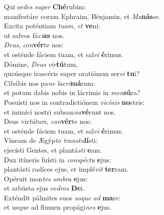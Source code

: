 \evenverse Qui se\textit{des} \textit{su}\textit{per} \textbf{Ché}rubim:~\*\\
\evenverse manifestáre coram Ephraim, Bénjamin, et \textit{Ma}\textbf{nás}se.\\
\oddverse Excita poténtiam \textit{tu}\textit{am}, \textit{et} \textbf{ve}ni:~\*\\
\oddverse ut salvos fá\textit{ci}\textbf{as} nos.\\
\evenverse \textit{De}\textit{us}, \textit{con}\textbf{vér}te nos:~\*\\
\evenverse et osténde fáciem tuam, et sal\textit{vi} \textbf{é}rimus.\\
\oddverse Dómine, \textit{De}\textit{us} \textit{vir}\textbf{tú}tum,~\*\\
\oddverse quoúsque irascéris super oratiónem ser\textit{vi} \textbf{tu}i?\\
\evenverse Cibábis nos pa\textit{ne} \textit{la}\textit{cri}\textbf{má}rum:~\*\\
\evenverse et potum dabis nobis in lácrimis in \textit{men}\textbf{sú}ra?\\
\oddverse Posuísti nos in contradictiónem \textit{vi}\textit{cí}\textit{nis} \textbf{no}stris:~\*\\
\oddverse et inimíci nostri subsan\textit{na}\textbf{vé}runt nos.\\
\evenverse Deus vir\textit{tú}\textit{tum}, \textit{con}\textbf{vér}te nos:~\*\\
\evenverse et osténde fáciem tuam, et sal\textit{vi} \textbf{é}rimus.\\
\oddverse Víneam de Ægýp\textit{to} \textit{tran}\textit{stu}\textbf{lí}sti:~\*\\
\oddverse ejecísti Gentes, et plantá\textit{sti} \textbf{e}am.\\
\evenverse Dux itíneris fuísti in \textit{con}\textit{spé}\textit{ctu} \textbf{e}jus:~\*\\
\evenverse plantásti radíces ejus, et implé\textit{vit} \textbf{ter}ram.\\
\oddverse Opéruit mon\textit{tes} \textit{um}\textit{bra} \textbf{e}jus:~\*\\
\oddverse et arbústa ejus ce\textit{dros} \textbf{De}i.\\
\evenverse Exténdit pálmites suos \textit{us}\textit{que} \textit{ad} \textbf{ma}re:~\*\\
\evenverse et usque ad flumen propági\textit{nes} \textbf{e}jus.\\
